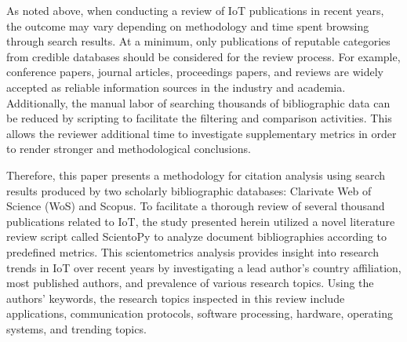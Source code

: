 \documentclass[symmetry,article,accept,moreauthors,pdftex10pt,a4paper]{mdpi}
\begin{document}

As noted above, when conducting a review of IoT publications in recent years, the outcome may vary depending on methodology and time spent browsing through search results. At a minimum, only publications of reputable categories from credible databases should be considered for the review process. For example, conference papers, journal articles, proceedings papers, and reviews are widely accepted as reliable information sources in the industry and academia. Additionally, the manual labor of searching thousands of bibliographic data can be reduced by scripting to facilitate the filtering and comparison activities. This allows the reviewer additional time to investigate supplementary metrics in order to render stronger and methodological conclusions.

Therefore, this paper presents a methodology for citation analysis using search results produced by two scholarly bibliographic databases: Clarivate Web of Science (WoS) and Scopus. To facilitate a thorough review of several thousand publications related to IoT, the study presented herein utilized a novel literature review script called ScientoPy to analyze document bibliographies according to predefined metrics. This scientometrics analysis provides insight into research trends in IoT over recent years by investigating a lead author's country affiliation, most published authors, and prevalence of various research topics. Using the authors' keywords, the research topics inspected in this review include applications, communication protocols, software processing, hardware, operating systems, and trending topics. 
\end{document}
